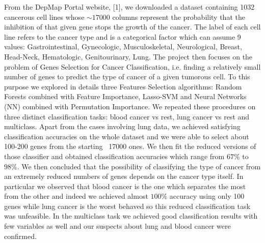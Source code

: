 \documentclass[a4paper,11pt, oneside]{article}  %
\begin{document}
From the DepMap Portal website, [1], we downloaded a dataset containing 1032 cancerous cell lines whose $\sim 17000$ columns represent the probability that the inhibition of that given gene stops the growth of the cancer.  The label of each cell line refers to the cancer type and is a categorical factor which can assume 9 values: Gastrointestinal,  Gynecologic,  Musculoskeletal,  Neurological,  Breast,  Head-Neck,  Hematologic,  Genitourinary,  Lung.  The project then focuses on the problem of Genes Selection for Cancer Classification,  i.e.  finding a relatively small number of genes to predict the type of cancer of a given tumorous cell.  To this purpose we explored in details three Features Selection algorithms: Random Forests combined with Feature Importance,  Lasso-SVM and Neural Networks (NN) combined with Permutation Importance.  We repeated these procedures on three distinct classification tasks: blood cancer vs rest,  lung cancer vs rest and multiclass.  Apart from the cases involving lung data,  we achieved satisfying classification accuracies on the whole dataset and we were able to select about 100-200 genes from the starting ~17000 ones.  We then fit the reduced versions of those classifier and obtained classification accuracies which range from $67\%$ to $98\%$.  We then concluded that the possibility of classifying the type of cancer from an extremely reduced numbers of genes depends on the cancer type itself.  In particular we observed that blood cancer is the one which separates the most from the other and indeed we achieved almost $100\%$ accuracy using only 100 genes while lung cancer is the worst behaved so this reduced classification task was unfeasible.  In the multiclass task we achieved good classification results with few variables as well and our suspects about lung and blood cancer were confirmed.  
\end{document}
